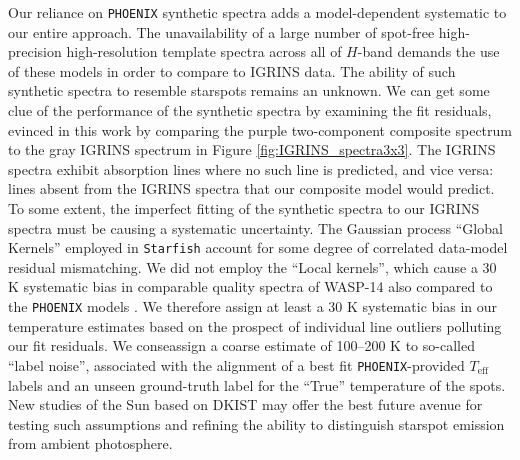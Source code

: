 \documentclass[modern,trackchanges]{aastex631}
\begin{document}
Our reliance on \texttt{PHOENIX} synthetic spectra adds a model-dependent systematic to our entire approach.  The unavailability of a large number of spot-free high-precision high-resolution template spectra across all of $H$-band demands the use of these models in order to compare to IGRINS data.  The ability of such synthetic spectra to resemble starspots remains an unknown.  We can get some clue of the performance of the synthetic spectra by examining the fit residuals, evinced in this work by comparing the purple two-component composite spectrum to the gray IGRINS spectrum in Figure \ref{fig:IGRINS_spectra3x3}. The IGRINS spectra exhibit absorption lines where no such line is predicted, and vice versa: lines absent from the IGRINS spectra that our composite model would predict.  To some extent, the imperfect fitting of the synthetic spectra to our IGRINS spectra must be causing a systematic uncertainty.  The Gaussian process ``Global Kernels'' employed in \texttt{Starfish} account for some degree of correlated data-model residual mismatching.  We did not employ the ``Local kernels'', which cause a 30 K systematic bias in comparable quality spectra of WASP-14 also compared to the \texttt{PHOENIX} models \citet{czekala15}.  We therefore assign at least a 30 K systematic bias in our temperature estimates based on the prospect of individual line outliers polluting our fit residuals.  We conseassign a coarse estimate of 100--200 K to so-called ``label noise'', associated with the alignment of a best fit \texttt{PHOENIX}-provided $T_{\text{eff}}$ labels and an unseen ground-truth label for the ``True'' temperature of the spots. New studies of the Sun based on DKIST may offer the best future avenue for testing such assumptions and refining the ability to distinguish starspot emission from ambient photosphere.


\end{document}
